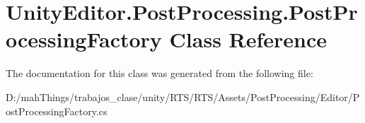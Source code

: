 \hypertarget{class_unity_editor_1_1_post_processing_1_1_post_processing_factory}{}\section{Unity\+Editor.\+Post\+Processing.\+Post\+Processing\+Factory Class Reference}
\label{class_unity_editor_1_1_post_processing_1_1_post_processing_factory}


The documentation for this class was generated from the following file\+:\begin{DoxyCompactItemize}
\item 
D\+:/mah\+Things/trabajos\+\_\+clase/unity/\+R\+T\+S/\+R\+T\+S/\+Assets/\+Post\+Processing/\+Editor/Post\+Processing\+Factory.\+cs\end{DoxyCompactItemize}
